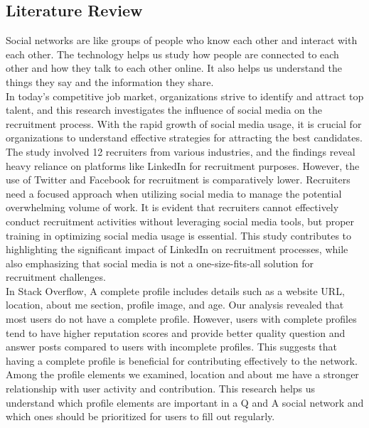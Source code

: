\subsection{Literature Review}
Social networks are like groups of people who know each other and interact with each other. The technology helps us study how people are connected to each other and how they talk to each other online. It also helps us understand the things they say and the information they share.\cite{korshunov2014social}\\
In today's competitive job market, organizations strive to identify and attract top talent, and this research investigates the influence of social media on the recruitment process. With the rapid growth of social media usage, it is crucial for organizations to understand effective strategies for attracting the best candidates. The study involved 12 recruiters from various industries, and the findings reveal heavy reliance on platforms like LinkedIn for recruitment purposes. However, the use of Twitter and Facebook for recruitment is comparatively lower. Recruiters need a focused approach when utilizing social media to manage the potential overwhelming volume of work. It is evident that recruiters cannot effectively conduct recruitment activities without leveraging social media tools, but proper training in optimizing social media usage is essential. This study contributes to highlighting the significant impact of LinkedIn on recruitment processes, while also emphasizing that social media is not a one-size-fits-all solution for recruitment challenges.\cite{koch2018impact}\\
In Stack Overflow, A complete profile includes details such as a website URL, location, about me section, profile image, and age. Our analysis revealed that most users do not have a complete profile. However, users with complete profiles tend to have higher reputation scores and provide better quality question and answer posts compared to users with incomplete profiles. This suggests that having a complete profile is beneficial for contributing effectively to the network. Among the profile elements we examined, location and about me have a stronger relationship with user activity and contribution. This research helps us understand which profile elements are important in a Q and A social network and which ones should be prioritized for users to fill out regularly.\cite{adaji2016towards}
